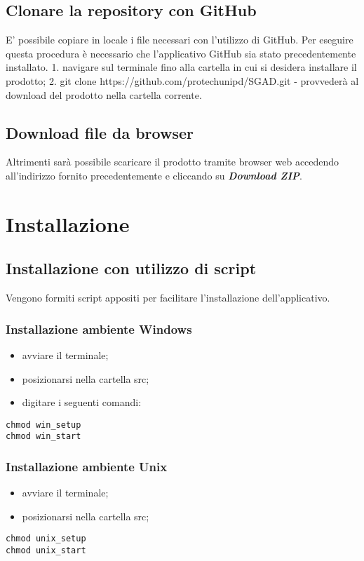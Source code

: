 \documentclass[12pt,a4paper]{article}
\begin{document}
	\subsection{Clonare la repository con GitHub}
	E' possibile copiare in locale i file necessari con l'utilizzo di GitHub. 
	Per eseguire questa procedura è necessario che l'applicativo GitHub sia stato precedentemente installato.
	1. navigare sul terminale fino alla cartella in cui si desidera installare il prodotto;
	2. git clone https://github.com/protechunipd/SGAD.git - provvederà al download
	del prodotto nella cartella corrente.
	\subsection{Download file da browser}
	Altrimenti sarà possibile scaricare il prodotto tramite browser web accedendo
	all’indirizzo fornito precedentemente e cliccando su \textbf{\textit{Download ZIP}}.
	
	\section{Installazione}\label{install}
	\subsection{Installazione con utilizzo di script}
	Vengono formiti script appositi per facilitare l'installazione dell'applicativo. 
	
		\subsubsection{Installazione ambiente Windows}
		\begin{itemize}
			\item avviare il terminale;
			\item posizionarsi nella cartella src;
			\item digitare i seguenti comandi:	
		\end{itemize}	
		\begin{center}
				\texttt{chmod win\_setup \\
					chmod win\_start	}
		\end{center}
	
		\subsubsection{Installazione ambiente Unix}
		\begin{itemize}
			\item avviare il terminale;
			\item posizionarsi nella cartella src;
		
		\end{itemize}
			\begin{center}
				\texttt{chmod unix\_setup \\
					chmod unix\_start	}
			\end{center}
		
\end{document}
